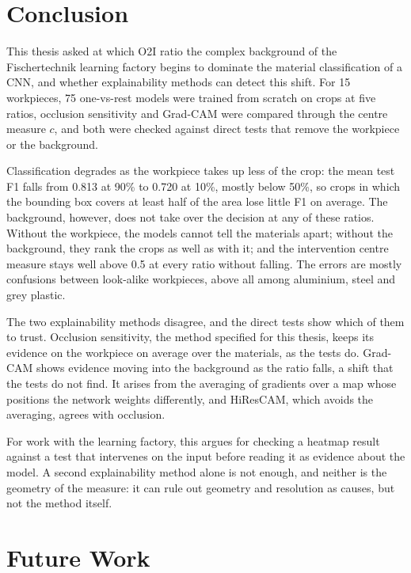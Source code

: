 \section{Conclusion}
\label{sec:discussion-conclusion}

This thesis asked at which O2I ratio the complex background of the Fischertechnik
learning factory begins to dominate the material classification of a CNN, and whether
explainability methods can detect this shift. For 15 workpieces, 75 one-vs-rest models
were trained from scratch on crops at five ratios, occlusion sensitivity and Grad-CAM
were compared through the centre measure $c$, and both were checked against direct tests
that remove the workpiece or the background.

Classification degrades as the workpiece takes up less of the crop: the mean test F1
falls from 0.813 at 90\% to 0.720 at 10\%, mostly below 50\%, so crops in which the
bounding box covers at least half of the area lose little F1 on average. The background,
however, does not take over the decision at any of these ratios. Without the workpiece,
the models cannot tell the materials apart; without the background, they rank the crops
as well as with it; and the intervention centre measure stays well above 0.5 at every
ratio without falling. The errors are mostly confusions between look-alike workpieces,
above all among aluminium, steel and grey plastic.

The two explainability methods disagree, and the direct tests show which of them to
trust. Occlusion sensitivity, the method specified for this thesis, keeps its evidence
on the workpiece on average over the materials, as the tests do. Grad-CAM shows evidence moving into the background as
the ratio falls, a shift that the tests do not find. It arises from the averaging of
gradients over a map whose positions the network weights differently, and HiResCAM,
which avoids the averaging, agrees with occlusion.

For work with the learning factory, this argues for checking a heatmap result against a
test that intervenes on the input before reading it as evidence about the model. A
second explainability method alone is not enough, and neither is the geometry of the
measure: it can rule out geometry and resolution as causes, but not the method itself.

\section{Future Work}
\label{sec:discussion-future}

